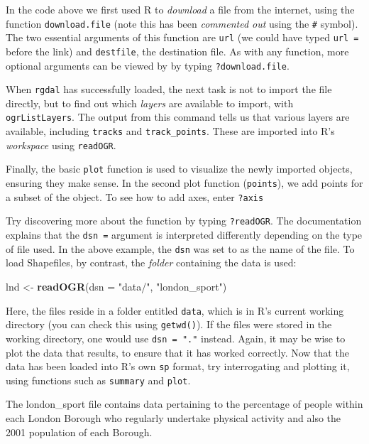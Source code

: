 \documentclass[]{article}
\newenvironment{Shaded}{}{}
\newcommand{\KeywordTok}[1]{\textcolor[rgb]{0.00,0.44,0.13}{\textbf{{#1}}}}
\newcommand{\DataTypeTok}[1]{\textcolor[rgb]{0.56,0.13,0.00}{{#1}}}
\newcommand{\StringTok}[1]{\textcolor[rgb]{0.25,0.44,0.63}{{#1}}}
\newcommand{\NormalTok}[1]{{#1}}
\begin{document}
In the code above we first used R to \emph{download} a file from the
internet, using the function \texttt{download.file} (note this has been
\emph{commented out} using the \texttt{\#} symbol). The two essential
arguments of this function are \texttt{url} (we could have typed
\texttt{url =} before the link) and \texttt{destfile}, the destination
file. As with any function, more optional arguments can be viewed by by
typing \texttt{?download.file}.

When \texttt{rgdal} has successfully loaded, the next task is not to
import the file directly, but to find out which \emph{layers} are
available to import, with \texttt{ogrListLayers}. The output from this
command tells us that various layers are available, including
\texttt{tracks} and \texttt{track\_points}. These are imported into R's
\emph{workspace} using \texttt{readOGR}.

Finally, the basic \texttt{plot} function is used to visualize the newly
imported objects, ensuring they make sense. In the second plot function
(\texttt{points}), we add points for a subset of the object. To see how
to add axes, enter \texttt{?axis}

Try discovering more about the function by typing \texttt{?readOGR}. The
documentation explains that the \texttt{dsn =} argument is interpreted
differently depending on the type of file used. In the above example,
the \texttt{dsn} was set to as the name of the file. To load Shapefiles,
by contrast, the \emph{folder} containing the data is used:

\begin{Shaded}
\begin{Highlighting}[]
\NormalTok{lnd <- }\KeywordTok{readOGR}\NormalTok{(}\DataTypeTok{dsn =} \StringTok{"data/"}\NormalTok{, }\StringTok{"london_sport"}\NormalTok{)}
\end{Highlighting}
\end{Shaded}
Here, the files reside in a folder entitled \texttt{data}, which is in
R's current working directory (you can check this using
\texttt{getwd()}). If the files were stored in the working directory,
one would use \texttt{dsn = "."} instead. Again, it may be wise to plot
the data that results, to ensure that it has worked correctly. Now that
the data has been loaded into R's own \texttt{sp} format, try
interrogating and plotting it, using functions such as \texttt{summary}
and \texttt{plot}.

The london\_sport file contains data pertaining to the percentage of
people within each London Borough who regularly undertake physical
activity and also the 2001 population of each Borough.
\end{document}
